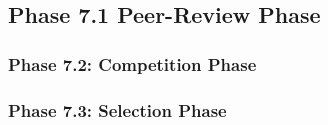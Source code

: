 \subsection*{Phase 7.1 Peer-Review Phase}

\subsubsection*{Phase 7.2: Competition Phase}

\subsubsection*{Phase 7.3: Selection Phase}
